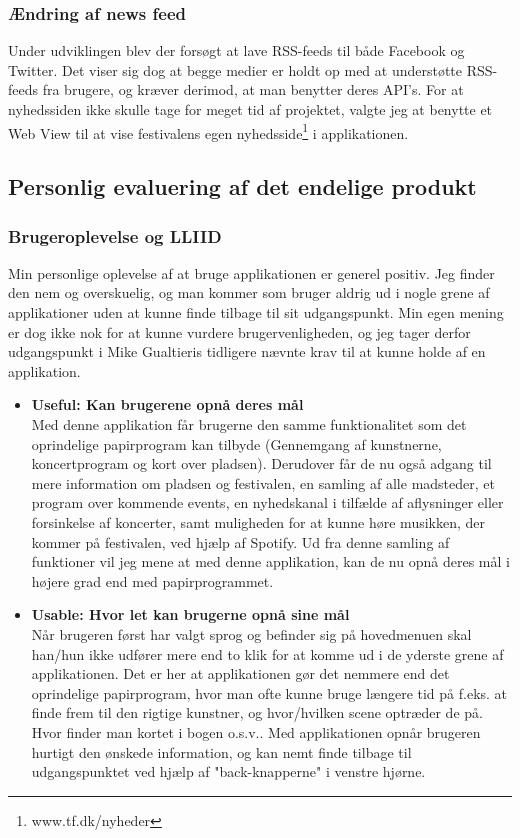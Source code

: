 \documentclass[a4paper,10pt,titlepage]{article}
\begin{document}
\subsubsection{Ændring af news feed}
Under udviklingen blev der forsøgt at lave RSS-feeds til både Facebook og Twitter. Det viser sig dog at begge medier er holdt op med at understøtte RSS-feeds fra brugere, og kræver derimod, at man benytter deres API's. For at nyhedssiden ikke skulle tage for meget tid af projektet, valgte jeg at benytte et Web View til at vise festivalens egen nyhedsside\footnote{www.tf.dk/nyheder} i applikationen.
\subsection{Personlig evaluering af det endelige produkt}
\subsubsection{Brugeroplevelse og LLIID}
Min personlige oplevelse af at bruge applikationen er generel positiv. Jeg finder den nem og overskuelig, og man kommer som bruger aldrig ud i nogle grene af applikationer uden at kunne finde tilbage til sit udgangspunkt. Min egen mening er dog ikke nok for at kunne vurdere brugervenligheden, og jeg tager derfor udgangspunkt i Mike Gualtieris tidligere nævnte krav til at kunne holde af en applikation.
\begin{itemize}
\item
\textbf{Useful: Kan brugerene opnå deres mål}\\
Med denne applikation får brugerne den samme funktionalitet som det oprindelige papirprogram kan tilbyde (Gennemgang af kunstnerne, koncertprogram og kort over pladsen). Derudover får de nu også adgang til mere information om pladsen og festivalen, en samling af alle madsteder, et program over kommende events, en nyhedskanal i tilfælde af aflysninger eller forsinkelse af koncerter, samt muligheden for at kunne høre musikken, der kommer på festivalen, ved hjælp af Spotify. Ud fra denne samling af funktioner vil jeg mene at med denne applikation, kan de nu opnå deres mål i højere grad end med papirprogrammet.\\
\item
\textbf{Usable: Hvor let kan brugerne opnå sine mål}\\
Når brugeren først har valgt sprog og befinder sig på hovedmenuen skal han/hun ikke udfører mere end to klik for at komme ud i de yderste grene af applikationen. Det er her at applikationen gør det nemmere end det oprindelige papirprogram, hvor man ofte kunne bruge længere tid på f.eks. at finde frem til den rigtige kunstner, og hvor/hvilken scene optræder de på. Hvor finder man kortet i bogen o.s.v.. Med applikationen opnår brugeren hurtigt den ønskede information, og kan nemt finde tilbage til udgangspunktet ved hjælp af "back-knapperne" i venstre hjørne.
\end{itemize}
\end{document}
